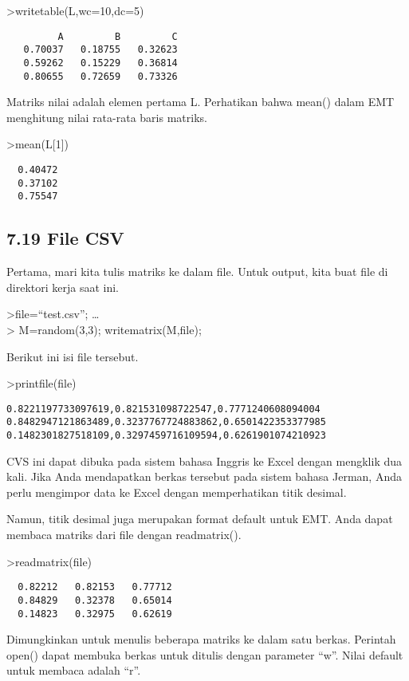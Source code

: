 \documentclass[
]{book}
\begin{document}
\textgreater writetable(L,wc=10,dc=5)

\begin{verbatim}
         A         B         C
   0.70037   0.18755   0.32623
   0.59262   0.15229   0.36814
   0.80655   0.72659   0.73326
\end{verbatim}

Matriks nilai adalah elemen pertama L. Perhatikan bahwa mean() dalam EMT menghitung nilai rata-rata baris matriks.

\textgreater mean(L{[}1{]})

\begin{verbatim}
  0.40472 
  0.37102 
  0.75547 
\end{verbatim}

\subsection{7.19 File CSV}\label{file-csv}

Pertama, mari kita tulis matriks ke dalam file. Untuk output, kita buat file di direktori kerja saat ini.

\textgreater file=``test.csv''; \ldots{}\\
\textgreater{} M=random(3,3); writematrix(M,file);

Berikut ini isi file tersebut.

\textgreater printfile(file)

\begin{verbatim}
0.8221197733097619,0.821531098722547,0.7771240608094004
0.8482947121863489,0.3237767724883862,0.6501422353377985
0.1482301827518109,0.3297459716109594,0.6261901074210923
\end{verbatim}

CVS ini dapat dibuka pada sistem bahasa Inggris ke Excel dengan mengklik dua kali. Jika Anda mendapatkan berkas tersebut pada sistem bahasa Jerman, Anda perlu mengimpor data ke Excel dengan memperhatikan titik desimal.

Namun, titik desimal juga merupakan format default untuk EMT. Anda dapat membaca matriks dari file dengan readmatrix().

\textgreater readmatrix(file)

\begin{verbatim}
  0.82212   0.82153   0.77712 
  0.84829   0.32378   0.65014 
  0.14823   0.32975   0.62619 
\end{verbatim}

Dimungkinkan untuk menulis beberapa matriks ke dalam satu berkas. Perintah open() dapat membuka berkas untuk ditulis dengan parameter ``w''. Nilai default untuk membaca adalah ``r''.
\end{document}

